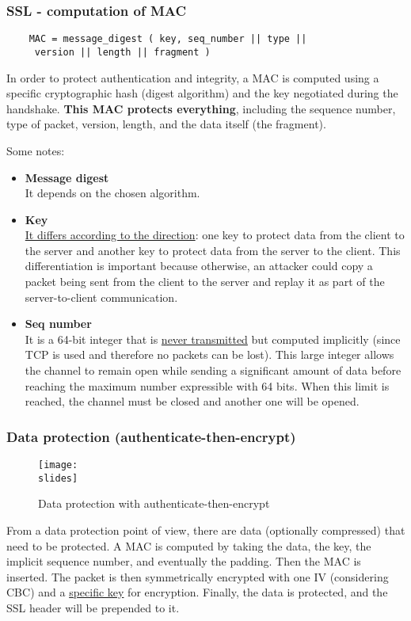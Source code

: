 \subsubsection{SSL - computation of MAC}
\begin{verbatim}
    MAC = message_digest ( key, seq_number || type ||
     version || length || fragment )
\end{verbatim}

In order to protect authentication and integrity, a MAC is computed using a specific cryptographic hash (digest algorithm) and the key negotiated during the handshake. \textbf{This MAC protects everything}, including the sequence number, type of packet, version, length, and the data itself (the fragment).

Some notes:
\begin{itemize}
    \item \textbf{Message digest} \\
          It depends on the chosen algorithm.
    \item \textbf{Key} \\
          \underline{It differs according to the direction}: one key to protect data from the client to the server and another key to protect data from the server to the client. This differentiation is important because otherwise, an attacker could copy a packet being sent from the client to the server and replay it as part of the server-to-client communication.
    \item \textbf{Seq number} \\
          It is a 64-bit integer that is \underline{never transmitted} but computed implicitly (since TCP is used and therefore no packets can be lost). This large integer allows the channel to remain open while sending a significant amount of data before reaching the maximum number expressible with 64 bits. When this limit is reached, the channel must be closed and another one will be opened.
\end{itemize}


\subsubsection{Data protection (authenticate-then-encrypt)}
\begin{figure}[h]
    \centering
    \texttt{[image: \\slides]}
    \caption{Data protection with authenticate-then-encrypt}
\end{figure}
From a data protection point of view, there are data (optionally compressed) that need to be protected. A MAC is computed by taking the data, the key, the implicit sequence number, and eventually the padding. Then the MAC is inserted. The packet is then symmetrically encrypted with one IV (considering CBC) and a \underline{specific key} for encryption. Finally, the data is protected, and the SSL header will be prepended to it.


